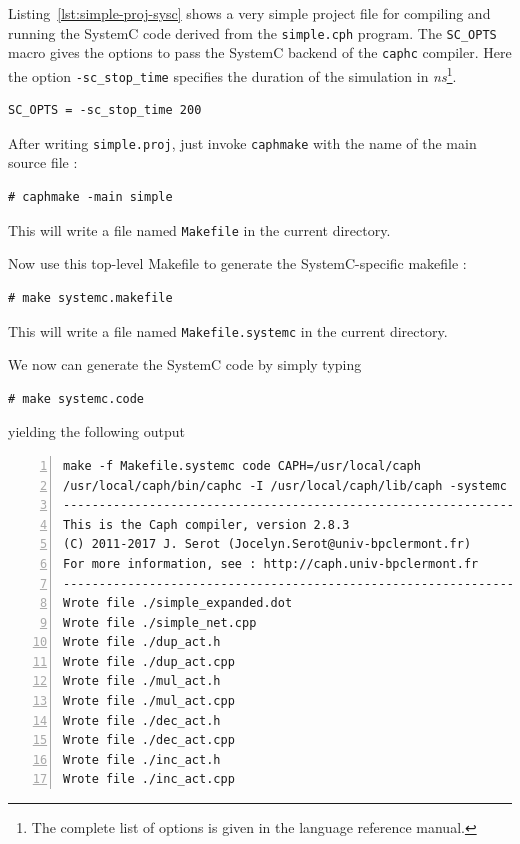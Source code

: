 \medskip Listing~\ref{lst:simple-proj-sysc} shows a very simple project file for compiling and
running the SystemC code derived from the \texttt{simple.cph} program. The \verb|SC_OPTS| macro
gives the options to pass the SystemC backend of the \texttt{caphc} compiler. 
Here the option \verb|-sc_stop_time| specifies the duration of the simulation in
\emph{ns}\footnote{The complete list of options is given in the language reference manual.}.

\begin{lstlisting}[style=MakeStyle,caption={File
    \texttt{simple.proj} for compiling and running SystemC code},label={lst:simple-proj-sysc}]
SC_OPTS = -sc_stop_time 200
\end{lstlisting}

\medskip
After writing \verb|simple.proj|, just invoke \texttt{caphmake} with the name of the main source
file :

\begin{lstlisting}[style=BashInputStyle]
# caphmake -main simple
\end{lstlisting}

This will write a file named \texttt{Makefile} in the current directory.

\medskip
Now use this top-level Makefile to generate the SystemC-specific makefile :

\begin{lstlisting}[style=BashInputStyle]
# make systemc.makefile
\end{lstlisting}

This will write a file named \texttt{Makefile.systemc} in the current directory.

\medskip
We now can generate the SystemC code by simply typing 

\begin{lstlisting}[style=BashInputStyle]
# make systemc.code
\end{lstlisting}

yielding the following output  

\begin{lstlisting}[style=BashOutputStyle,numbers=left,numberstyle=\tiny]
make -f Makefile.systemc code CAPH=/usr/local/caph
/usr/local/caph/bin/caphc -I /usr/local/caph/lib/caph -systemc -sc_stop_time 200 simple.cph
-------------------------------------------------------------------------------------------------
This is the Caph compiler, version 2.8.3
(C) 2011-2017 J. Serot (Jocelyn.Serot@univ-bpclermont.fr)
For more information, see : http://caph.univ-bpclermont.fr
-------------------------------------------------------------------------------------------------
Wrote file ./simple_expanded.dot
Wrote file ./simple_net.cpp
Wrote file ./dup_act.h
Wrote file ./dup_act.cpp
Wrote file ./mul_act.h
Wrote file ./mul_act.cpp
Wrote file ./dec_act.h
Wrote file ./dec_act.cpp
Wrote file ./inc_act.h
Wrote file ./inc_act.cpp
\end{lstlisting}

